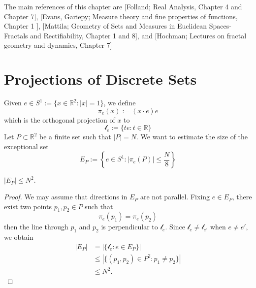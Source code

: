 \theoremstyle{definition}

The main references of this chapter are [Folland; Real Analysis, Chapter 4 and Chapter 7], [Evans, Gariepy; Measure theory and fine properties of functions, Chapter 1 ], [Mattila; Geometry of Sets and Measures in Euclidean Spaces-Fractals and Rectifiability, Chapter 1 and 8], and [Hochman; Lectures on fractal geometry and dynamics, Chapter 7]



    \section{Projections of Discrete Sets}
    Given $e\in S^{1}:=\{ x \in \mathbb{R}^{2}:|x|=1 \}$, we define
        \begin{equation*}
            \pi _{e}(x):=(x\cdot e)e
        \end{equation*}
    which is the orthogonal projection of $x$ to
        \begin{equation*}
            \mathscr{l}_{e}:=\{ te: t \in \mathbb{R} \}
        \end{equation*}
    Let $P\subset \mathbb{R}^{2}$ be a finite set such that $|P|=N$. We want to estimate the size of the exceptional set
        \begin{equation*}
            E_{P}:=\left\{  e \in S^{1}: |\pi _{e}(P)|\leq \frac{N}{8}  \right\}
        \end{equation*}

    \begin{lemma}
    $|E_{P}|\leq N^{2}$.
    \end{lemma}
    \begin{proof}
        We may assume that directions in $E_{P}$ are not parallel. Fixing $e \in E_{P}$, there exist two points $p_{1},p_{2} \in P$ such that
            \begin{equation*}
                \pi _{e}(p_{1})=\pi _{e}(p_{2})
            \end{equation*}
        then the line through $p_{1}$ and $p_{2}$ is perpendicular to $\mathscr{l}_{e}$. Since $\mathscr{l}_{e}\neq \mathscr{l}_{e'}$ when $e\neq e'$, we obtain
        \begin{align*}
            |E_{P}| & =|\{ \mathscr{l}_{e}: e \in E_{P} \}| \\
            & \leq|\{ (p_1,p_{2})\in P^{2}:p_{1}\neq p_{2} \}| \\
            & \leq N^{2}.
        \end{align*}
    \end{proof}

